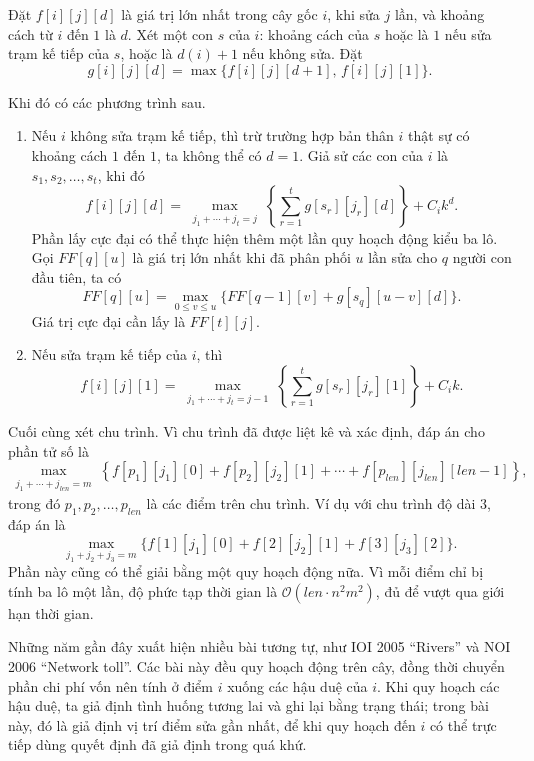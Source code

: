 \documentclass[11pt]{article}
\newcommand{\Oh}{\mathcal{O}}
\begin{document}
Đặt $f[i][j][d]$ là giá trị lớn nhất trong cây gốc $i$, khi sửa $j$ lần, và
khoảng cách từ $i$ đến $1$ là $d$. Xét một con $s$ của $i$: khoảng cách của
$s$ hoặc là $1$ nếu sửa trạm kế tiếp của $s$, hoặc là $d(i)+1$ nếu không sửa.
Đặt
\[
  g[i][j][d]=\max\{f[i][j][d+1],\, f[i][j][1]\}.
\]

Khi đó có các phương trình sau.

\begin{enumerate}
  \item Nếu $i$ không sửa trạm kế tiếp, thì trừ trường hợp bản thân $i$ thật
  sự có khoảng cách $1$ đến $1$, ta không thể có $d=1$. Giả sử các con của
  $i$ là $s_1,s_2,\ldots,s_t$, khi đó
  \[
    f[i][j][d]
    =
    \max_{\substack{j_1+\cdots+j_t=j}}
    \left\{
      \sum_{r=1}^{t} g[s_r][j_r][d]
    \right\}
    +C_i k^d.
  \]
  Phần lấy cực đại có thể thực hiện thêm một lần quy hoạch động kiểu ba lô.
  Gọi \(FF[q][u]\) là giá trị lớn nhất khi đã phân phối $u$ lần sửa cho
  $q$ người con đầu tiên, ta có
  \[
    FF[q][u]=\max_{0\le v\le u}\{FF[q-1][v]+g[s_q][u-v][d]\}.
  \]
  Giá trị cực đại cần lấy là \(FF[t][j]\).

  \item Nếu sửa trạm kế tiếp của $i$, thì
  \[
    f[i][j][1]
    =
    \max_{\substack{j_1+\cdots+j_t=j-1}}
    \left\{
      \sum_{r=1}^{t} g[s_r][j_r][1]
    \right\}
    +C_i k.
  \]
\end{enumerate}

Cuối cùng xét chu trình. Vì chu trình đã được liệt kê và xác định, đáp án cho
phần tử số là
\[
  \max_{\substack{j_1+\cdots+j_{\mathit{len}}=m}}
  \left\{
    f[p_1][j_1][0]+f[p_2][j_2][1]+\cdots+
    f[p_{\mathit{len}}][j_{\mathit{len}}][\mathit{len}-1]
  \right\},
\]
trong đó \(p_1,p_2,\ldots,p_{\mathit{len}}\) là các điểm trên chu trình. Ví
dụ với chu trình độ dài $3$, đáp án là
\[
  \max_{j_1+j_2+j_3=m}
  \{f[1][j_1][0]+f[2][j_2][1]+f[3][j_3][2]\}.
\]
Phần này cũng có thể giải bằng một quy hoạch động nữa. Vì mỗi điểm chỉ bị
tính ba lô một lần, độ phức tạp thời gian là
\(\Oh(\mathit{len}\cdot n^2m^2)\), đủ để vượt qua giới hạn thời gian.

Những năm gần đây xuất hiện nhiều bài tương tự, như IOI 2005 ``Rivers'' và
NOI 2006 ``Network toll''. Các bài này đều quy hoạch động trên cây, đồng thời
chuyển phần chi phí vốn nên tính ở điểm $i$ xuống các hậu duệ của $i$. Khi
quy hoạch các hậu duệ, ta giả định tình huống tương lai và ghi lại bằng trạng
thái; trong bài này, đó là giả định vị trí điểm sửa gần nhất, để khi quy hoạch
đến $i$ có thể trực tiếp dùng quyết định đã giả định trong quá khứ.
\end{document}
